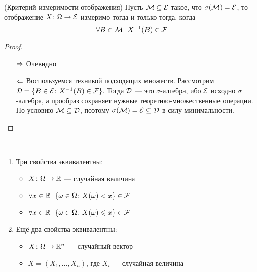 \begin{lemma} (Критерий измеримости отображения)
	Пусть $\mathcal{M} \subseteq \mathcal{E}$ такое, что $\sigma(\mathcal{M}) = \mathcal{E}$, то отображение $X \colon \Omega \to \mathcal{E}$ измеримо тогда и только тогда, когда
	\[
		\forall B \in \cM\ \ X^{-1}(B) \in \F
	\]
\end{lemma}

\begin{proof}~
	\begin{itemize}
		\item[$\Rightarrow$] Очевидно
		
		\item[$\Leftarrow$] Воспользуемся техникой подходящих множеств. Рассмотрим $\mathcal{D} = \{B \in \mathcal{E} \colon X^{-1}(B) \in \mathcal{F}\}$. Тогда $\mathcal{D}$ --- это $\sigma$-алгебра, ибо $\mathcal{E}$ исходно $\sigma$-алгебра, а прообраз сохраняет нужные теоретико-множественные операции. По условию $\mathcal{M} \subseteq \mathcal{D}$, поэтому $\sigma(\mathcal{M}) = \mathcal{E} \subseteq \mathcal{D}$ в силу минимальности.
	\end{itemize}
\end{proof}

\begin{corollary}~
	\begin{enumerate}
		\item Три свойства эквивалентны:
		\begin{itemize}
			\item $X \colon \Omega \to \mathbb{R}$ --- случайная величина
			
			\item $\forall x \in \mathbb{R}\ \ \{\omega \in \Omega \colon X(\omega) < x\} \in \mathcal{F}$
			
			\item $\forall x \in \mathbb{R}\ \ \{\omega \in \Omega \colon X(\omega) \leqslant x\} \in \mathcal{F}$
		\end{itemize}
		
		\item Ещё два свойства эквивалентны:
		\begin{itemize}
			\item $X \colon \Omega \to \mathbb{R}^n$ --- случайный вектор
			
			\item $X = (X_1, \ldots, X_n)$, где $X_i$ --- случайная величина
		\end{itemize}
	\end{enumerate}
\end{corollary}


